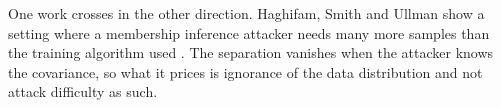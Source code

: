 One work crosses in the other direction. Haghifam, Smith and Ullman show a
setting where a membership inference attacker needs many more samples than the
training algorithm used \cite{HSU25}. The separation vanishes when the
attacker knows the covariance, so what it prices is ignorance of the data
distribution and not attack difficulty as such.
